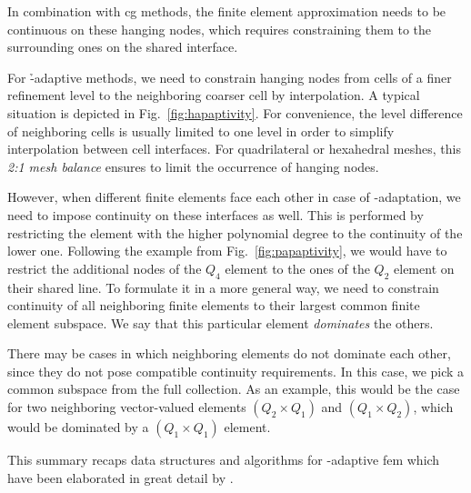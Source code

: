 In combination with \gls{cg} methods, the finite element approximation needs to be continuous on these hanging nodes, which requires constraining them to the surrounding ones on the shared interface.

For \h-adaptive methods, we need to constrain hanging nodes from cells of a finer refinement level to the neighboring coarser cell by interpolation. A typical situation is depicted in Fig.~\ref{fig:hapaptivity}. For convenience, the level difference of neighboring cells is usually limited to one level in order to simplify interpolation between cell interfaces. For quadrilateral or hexahedral meshes, this \textit{2:1 mesh balance} ensures to limit the occurrence of hanging nodes.

However, when different finite elements face each other in case of \p-adaptation, we need to impose continuity on these interfaces as well. This is performed by restricting the element with the higher polynomial degree to the continuity of the lower one. Following the example from Fig.~\ref{fig:papaptivity}, we would have to restrict the additional nodes of the $Q_4$ element to the ones of the $Q_2$ element on their shared line. To formulate it in a more general way, we need to constrain continuity of all neighboring finite elements to their largest common finite element subspace. We say that this particular element \textit{dominates} the others.

There may be cases in which neighboring elements do not dominate each other, since they do not pose compatible continuity requirements. In this case, we pick a common subspace from the full collection. As an example, this would be the case for two neighboring vector-valued elements $(Q_2 \times Q_1)$ and $(Q_1 \times Q_2)$, which would be dominated by a $(Q_1 \times Q_1)$ element.

This summary recaps data structures and algorithms for \hp-adaptive \gls{fem} which have been elaborated in great detail by \textcite{bangerth2009}.





